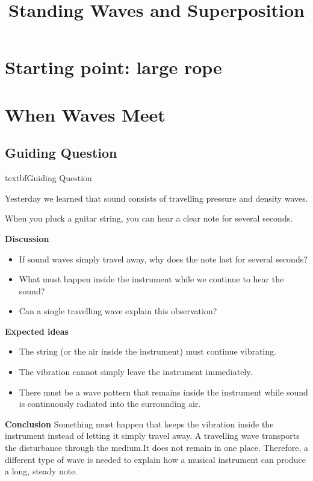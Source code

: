 \documentclass[a4paper,11pt]{article}
\title{Standing Waves and Superposition}
\author{}
\date{}
\begin{document}
\maketitle

\section{Starting point: large rope}

\section{When Waves Meet}

\subsection*{Guiding Question}


textbf{Guiding Question}

Yesterday we learned that sound consists of travelling pressure and density waves.

When you pluck a guitar string, you can hear a clear note for several seconds.

\textbf{Discussion}
\begin{itemize}
    \item If sound waves simply travel away, why does the note last for several seconds?
    \item What must happen inside the instrument while we continue to hear the sound?
    \item Can a single travelling wave explain this observation?
\end{itemize} 

\textbf{Expected ideas}
\begin{itemize}
    \item The string (or the air inside the instrument) must continue vibrating.
    \item The vibration cannot simply leave the instrument immediately.
    \item There must be a wave pattern that remains inside the instrument while sound is continuously radiated into the surrounding air.
\end{itemize}


\textbf{Conclusion}  Something must happen that keeps the vibration inside the instrument instead of letting it simply travel away.
A travelling wave transports the disturbance through the medium.It does not remain in one place. Therefore, a different type of wave is needed to explain how a musical instrument can produce a long, steady note.
\end{document}
